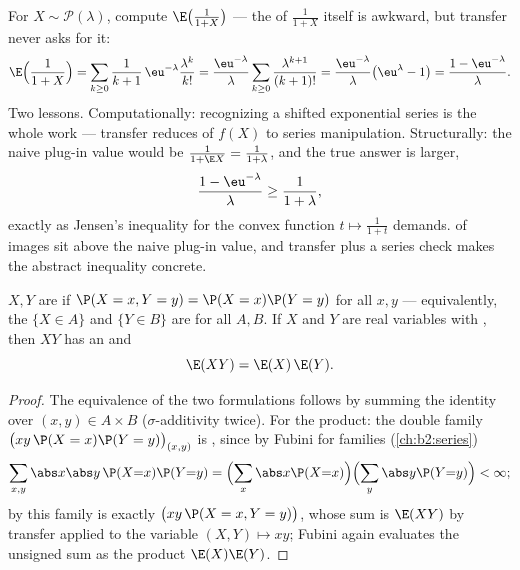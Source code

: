 \begin{example}\label{ex:b2:randomvar:transferex}
For $X \sim \mathcal P(\lambda)$, compute
$\E\bigl(\frac1{1+X}\bigr)$ --- the  of $\frac1{1+X}$
itself is awkward, but transfer never asks for it:
\[
\E\Bigl(\frac1{1+X}\Bigr)
= \sum_{k\geq0}\frac{1}{k+1}\,\eu^{-\lambda}
\frac{\lambda^k}{k!}
= \frac{\eu^{-\lambda}}{\lambda}\sum_{k\geq0}
\frac{\lambda^{k+1}}{(k+1)!}
= \frac{\eu^{-\lambda}}{\lambda}\bigl(\eu^\lambda - 1\bigr)
= \frac{1 - \eu^{-\lambda}}{\lambda} .
\]
Two lessons. Computationally: recognizing a shifted
exponential series is the whole work --- transfer reduces
 of $f(X)$ to series manipulation. Structurally:
the naive plug-in value would be $\frac1{1 + \E X} =
\frac1{1 + \lambda}$, and the true answer is larger,
\[
\frac{1 - \eu^{-\lambda}}{\lambda} \geq
\frac{1}{1 + \lambda},
\]
exactly as Jensen's inequality for the convex function $t
\mapsto \frac1{1+t}$ demands.  of
 images sit above the naive plug-in value, and transfer
plus a series check makes the abstract inequality concrete.
\end{example}

\begin{theorem}\label{thm:b2:randomvar:product}
 $X, Y$ are \emph{} if $\P(X = x, Y =
y) = \P(X = x)\P(Y = y)$ for all $x, y$ --- equivalently, the
 $\{X \in A\}$ and $\{Y \in B\}$ are  for all $A,
B$. If $X$ and $Y$ are  real variables with
, then $XY$ has an  and
\[
\E(XY) = \E(X)\,\E(Y) .
\]
\end{theorem}

\begin{proof}
The equivalence of the two formulations follows by summing the
 identity over $(x, y) \in A \times B$
($\sigma$-additivity twice). For the product: the double family
$\bigl(xy\,\P(X = x)\P(Y = y)\bigr)_{(x,y)}$ is , since by
Fubini for families (\cref{ch:b2:series})
\[
\sum_{x, y}\abs x \abs y\,\P(X{=}x)\P(Y{=}y)
= \Bigl(\sum_x \abs x \P(X{=}x)\Bigr)
\Bigl(\sum_y \abs y \P(Y{=}y)\Bigr) < \infty ;
\]
by  this family is exactly $\bigl(xy\,\P(X = x, Y =
y)\bigr)$, whose sum is $\E(XY)$ by transfer applied to the
variable $(X, Y) \mapsto xy$; Fubini again evaluates the unsigned
sum as the product $\E(X)\E(Y)$.
\end{proof}

